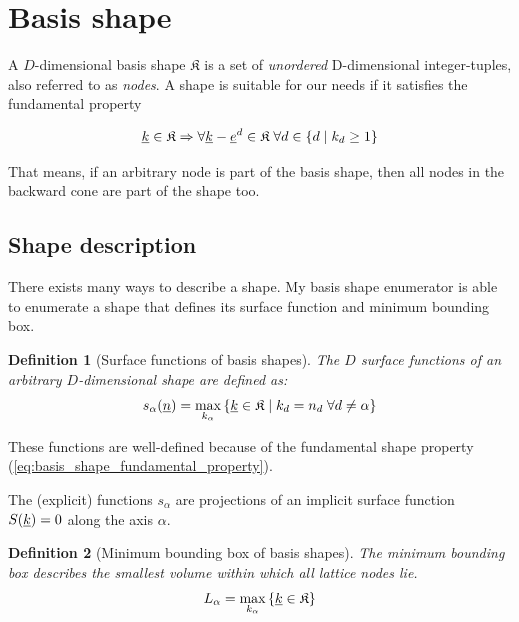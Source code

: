 \documentclass{article}
\newtheorem*{definition}{Definition}
\begin{document}
\tableofcontents
\clearpage

\section{Basis shape}

A \(D\)-dimensional basis shape \(\mathfrak{K}\)
is a set of \emph{unordered} D-dimensional integer-tuples, also
referred to as \emph{nodes}.  A shape is suitable for our needs if it
satisfies the fundamental property

\begin{equation}
  \label{eq:basis_shape_fundamental_property}
  \underline{k} \in \mathfrak{K} \Rightarrow \forall
  \underline{k}-\underline{e}^d \in \mathfrak{K} \;\forall d \in \{d \;|\;k_d \geq 1\}
\end{equation}

That means, if an arbitrary node is part of the basis shape, then all nodes
in the backward cone are part of the shape too.

\subsection{Shape description}
There exists many ways to describe a shape. My basis shape enumerator
is able to enumerate a shape that defines its surface function and
minimum bounding box.

\begin{definition}[Surface functions of basis shapes]
  The \(D\) surface functions of an arbitrary \(D\)-dimensional shape are defined as:
  \begin{equation}
  s_{\alpha}(\underline{n})=\max_{k_{\alpha}}
    \left\{\underline{k} \in \mathfrak{K} \;|\;
      k_d = n_d \; \forall d \neq \alpha
    \right\}
    \label{eq:basis_shape_surface_function}
  \end{equation}
\end{definition}

These functions are well-defined because of the fundamental shape property
(\ref{eq:basis_shape_fundamental_property}).

The (explicit) functions \(s_{\alpha}\) are projections of an
implicit surface function \(S(\underline{k}) = 0\) along the axis \(\alpha\).

\begin{definition}[Minimum bounding box of basis shapes]
  The minimum bounding box describes the smallest
  volume within which all lattice nodes lie.
  \begin{equation}
    L_{\alpha}=\max_{k_{\alpha}}\left\{\underline{k} \in \mathfrak{K}\right\}
    \label{eq:basis_shape_bbox}
  \end{equation}
\end{definition}
\end{document}
